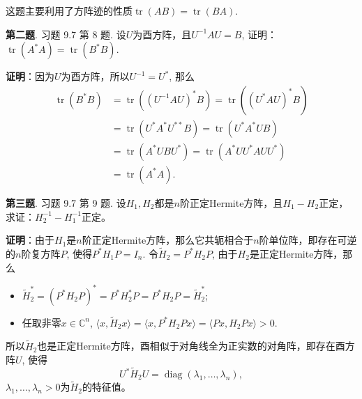 \vspace{1em}

这题主要利用了方阵迹的性质$\operatorname{tr}(AB) = \operatorname{tr}(BA)$.


\newpageorvspace


{\bf 第二题}. 习题 9.7 第 8 题. 设$U$为酉方阵，且$U^{-1}AU = B$, 证明：$\operatorname{tr} \left( A^* A \right) = \operatorname{tr} \left( B^* B \right).$

\newpageorvspace

{\bf 证明}：因为$U$为酉方阵，所以$U^{-1} = U^*$, 那么
\begin{align*}
\operatorname{tr} \left( B^* B \right) & = \operatorname{tr} \left( \left( U^{-1} A U \right)^* B \right) = \operatorname{tr} \left( \left( U^* A U \right)^* B \right) \\
& = \operatorname{tr} \left( U^* A^* U^{**} B \right) = \operatorname{tr} \left( U^* A^* U B \right) \\
& = \operatorname{tr} \left( A^* U B U^* \right) = \operatorname{tr} \left( A^* U U^* A U U^* \right) \\
& = \operatorname{tr} \left( A^* A \right).
\end{align*}


\newpageorvspace


{\bf 第三题}. 习题 9.7 第 9 题. 设$H_1, H_2$都是$n$阶正定Hermite方阵，且$H_1 - H_2$正定，求证：$H_2^{-1} - H_1^{-1}$正定。

\newpageorvspace

{\bf 证明}：由于$H_1$是$n$阶正定Hermite方阵，那么它共轭相合于$n$阶单位阵，即存在可逆的$n$阶复方阵$P$, 使得$P^* H_1 P = I_n$. 令$\widetilde{H}_2 = P^* H_2 P$, 由于$H_2$是正定Hermite方阵，那么
\begin{itemize}
\item $\widetilde{H}_2^* = \left( P^* H_2 P \right)^* = P^* H_2^* P = P^* H_2 P = \widetilde{H}_2^*$;
\item 任取非零$x \in \mathbb{C}^n$, $\langle x, \widetilde{H}_2 x \rangle = \langle x, P^* H_2 P x \rangle = \langle Px, H_2 P x \rangle > 0$.
\end{itemize}
所以$\widetilde{H}_2$也是正定Hermite方阵，酉相似于对角线全为正实数的对角阵，即存在酉方阵$U$, 使得
$$U^* \widetilde{H}_2 U = \operatorname{diag} (\lambda_1, \ldots, \lambda_n),$$
$\lambda_1, \ldots, \lambda_n > 0$为$\widetilde{H}_2$的特征值。

